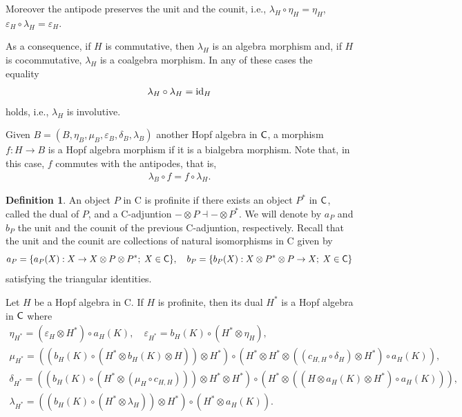 \documentclass[11pt,reqno]{amsart}
\theoremstyle{plain}%
\theoremstyle{definition}
\newtheorem{definition}[theorem]{Definition}%
\theoremstyle{remark}
\begin{document}
Moreover the antipode preserves the unit and the counit, i.e.,
$\lambda_{H}\circ\eta_{H}=\eta_{H}$,
$\varepsilon_{H}\circ\lambda_{H}=\varepsilon_{H}.$


As a consequence, if $H$ is commutative, then  $\lambda_H$ is an algebra morphism and, if $H$ is cocommutative,  $\lambda_H$ is a coalgebra morphism. In any of these cases the equality  
\begin{gather}\label{lambdasquareid}
	\lambda_{H}\circ\lambda_{H}={\rm id}_{H}
\end{gather}
holds,  i.e., $\lambda_H$ is involutive.

Given $B=(B,\eta_{B},\mu_{B},\varepsilon_{B},\delta_{B},\lambda_{B})$ another Hopf algebra in ${\sf C}$, a morphism $f\colon H\rightarrow B$ is a Hopf algebra morphism if it is a bialgebra morphism. Note that, in this case, $f$ commutes with the antipodes, that is,
\begin{gather*}\label{morant}
	\lambda_{B}\circ f=f\circ\lambda_{H}.
\end{gather*}


\begin{definition}
	An object $P$ in {\sf C} is profinite if there exists an object $P^{\ast}$ in ${\sf C}$, called the dual of $P$, and a  {\sf C}-adjuntion $-\otimes P\dashv -\otimes P^{\ast}$. We will denote by $a_{P}$ and $b_{P}$ the unit and the counit of the previous  {\sf C}-adjuntion, respectively. Recall that the unit and the counit are collections of natural isomorphisms in {\sf C} given by $$a_{P}=\{a_{P}(X):X\rightarrow X\otimes P\otimes P^{\ast}; \; X\in {\sf C}\},\quad b_{P}=\{b_{P}(X):X\otimes  P^{\ast}\otimes P\rightarrow X; \; X\in {\sf C}\}$$ satisfying the triangular identities. 
	

\end{definition}

Let $H$ be a Hopf algebra in {\sf C}. If $H$ is profinite, then its dual $H^{\ast}$ is a Hopf algebra in ${\sf C}$ where 
\begin{gather*}\eta_{H^{\ast}}=(\varepsilon_{H}\otimes H^{\ast})\circ a_{H}(K), \quad \varepsilon_{H^{\ast}}=b_{H}(K)\circ (H^{\ast}\otimes \eta_{H}),\\
\mu_{H^{\ast}}=((b_{H}(K)\circ (H^{\ast}\otimes b_{H}(K) \otimes H)) \otimes H^{\ast})\circ (H^{\ast}\otimes H^{\ast}\otimes ((c_{H,H}\circ \delta_{H})\otimes H^{\ast})\circ a_{H}(K)),\\
\delta_{H^{\ast}}=((b_{H}(K)\circ (H^{\ast}\otimes (\mu_{H}\circ c_{H,H})))\otimes H^{\ast}\otimes H^{\ast})\circ (H^{\ast}\otimes ((H\otimes a_{H}(K)\otimes H^{\ast})\circ a_{H}(K))),\\
\lambda_{H^{\ast}}=((b_{H}(K)\circ (H^{\ast}\otimes\lambda_{H} ))\otimes H^{\ast})\circ (H^{\ast}\otimes a_{H}(K)).
\end{gather*}
\end{document}
